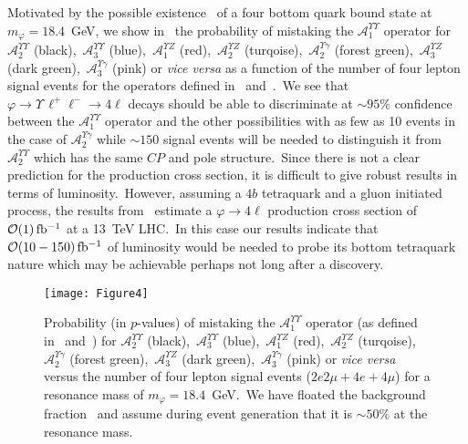 \documentclass[nofootinbib,twocolumn,prl,preprintnumbers]{revtex4-1}
\begin{document}
Motivated by the possible existence~\cite{CMSpub} of a four bottom quark bound state at $m_\varphi = 18.4$~GeV, we show in~ the probability of mistaking the $\mathcal{A}_{1}^{\Upsilon\Upsilon}$ operator for $\mathcal{A}_{2}^{\Upsilon\Upsilon}$ (black),~$\mathcal{A}_{3}^{\Upsilon\Upsilon}$ (blue),~$\mathcal{A}_{1}^{\Upsilon Z}$ (red),~$\mathcal{A}_{2}^{\Upsilon Z}$ (turqoise),~$\mathcal{A}_{2}^{\Upsilon \gamma}$ (forest green),~$\mathcal{A}_{3}^{\Upsilon Z}$ (dark green),~$\mathcal{A}_{3}^{\Upsilon \gamma}$ (pink) or \emph{vice versa} as a function of the number of four lepton signal events for the operators defined in~ and~.~We see that $\varphi \to \Upsilon \,\ell^+\ell^- \to 4\ell$ decays should be able to discriminate at $\sim95\%$ confidence between the $\mathcal{A}_{1}^{\Upsilon\Upsilon}$ operator and the other possibilities with as few as 10 events in the case of $\mathcal{A}_{2}^{\Upsilon\gamma}$ while $\sim 150$ signal events will be needed to distinguish it from $\mathcal{A}_{2}^{\Upsilon\Upsilon}$ which has the same $CP$ and pole structure.~Since there is not a clear prediction for the production cross section, it is difficult to give robust results in terms of luminosity.~However, assuming a $4b$ tetraquark and a gluon initiated process, the results from~\cite{Eichten:2017ual} estimate a $\varphi \to 4\ell$ production cross section of $\mathcal{O}(1)\,\rm{fb^{-1}}$ at a 13~TeV LHC.~In this case our results indicate that $\mathcal{O}(10-150)\,\rm{fb^{-1}}$ of luminosity would be needed to probe its bottom tetraquark nature which may be achievable perhaps not long after a discovery. 
\begin{figure}[tbh]
\begin{center}
\texttt{[image: Figure4]}
\caption{Probability  (in $p$-values) of mistaking the $\mathcal{A}_{1}^{\Upsilon\Upsilon}$ operator (as defined in~ and~) for $\mathcal{A}_{2}^{\Upsilon\Upsilon}$ (black),~$\mathcal{A}_{3}^{\Upsilon\Upsilon}$ (blue),~$\mathcal{A}_{1}^{\Upsilon Z}$ (red),~$\mathcal{A}_{2}^{\Upsilon Z}$ (turqoise),~ $\mathcal{A}_{2}^{\Upsilon \gamma}$ (forest green),~$\mathcal{A}_{3}^{\Upsilon Z}$ (dark green),~$\mathcal{A}_{3}^{\Upsilon \gamma}$ (pink) or \emph{vice versa} versus the number of four lepton signal events ($2e2\mu + 4e + 4\mu$) for a resonance mass of $m_\varphi = 18.4$~GeV.~We have floated the background fraction~\cite{Chen:2013ejz,Chen:2014pia} and assume during event generation that it is $\sim 50\%$ at the resonance mass.}
\label{fig:hyptest}
\end{center}
\end{figure}
\end{document}
